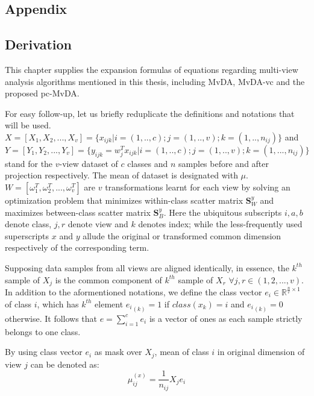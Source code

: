 
\cleardoublepage
{}
\ohead[]{\pagemark}
\begin{appendix}
\chapter{Appendix} \label{chap:appendix}

\section{Derivation} \label{app:derivation}

This chapter supplies the expansion formulas of equations regarding multi-view analysis algorithms mentioned in this thesis, including MvDA, MvDA-vc and the proposed pc-MvDA.

For easy follow-up, let us briefly reduplicate the definitions and notations that will be used.
$X = \left[X_1, X_2, ..., X_v\right] = \{x_{ijk}|i=(1,..,c);j = (1,..,v);k=(1,..,n_{ij})\}$ and $Y = \left[Y_1, Y_2, ..., Y_v\right] = \{y_{ijk} = w_j^T x_{ijk}|i=(1,..,c); j=(1,..,v); k=(1,...,n_{ij})\}$ stand for the $v$-view dataset of $c$ classes and $n$ samples before and after projection respectively.
The mean of dataset is designated with $\mu$.
$W = \left[\omega_1^T, \omega_2^T, ..., \omega_v^T\right]$ are $v$ transformations learnt for each view by solving an optimization problem that minimizes within-class scatter matrix $\boldsymbol{S}^y_W$ and maximizes between-class scatter matrix $\boldsymbol{S}^y_B$.
Here the ubiquitous subscripts $i, a, b$ denote class, $j, r$ denote view and $k$ denotes index; while the less-frequently used superscripts $x$ and $y$ allude the original or transformed common dimension respectively of the corresponding term.

Supposing data samples from all views are aligned identically, in essence, the $k^{th}$ sample of $X_j$ is the common component of $k^{th}$ sample of $X_r$ $\forall j, r \in (1, 2, ..., v)$.
In addition to the aformentioned notations, we define the class vector $e_i \in \mathbb{R}^{\frac{n}{v}\times 1}$ of class $i$, which has $k^{th}$ element ${e_i}_{(k)} = 1$ if $class(x_k) = i$ and ${e_i}_{(k)} = 0$ otherwise.
It follows that $e = \sum_{i=1}^{c}e_i$ is a vector of ones as each sample strictly belongs to one class.

By using class vector $e_i$ as mask over $X_j$, mean of class $i$ in original dimension of view $j$ can be denoted as:
\begin{equation}
    \mu^{(x)}_{ij} = \frac{1}{n_{ij}}X_j e_i
    \label{eq:mean_from_class_vector}
\end{equation}


\end{appendix}
